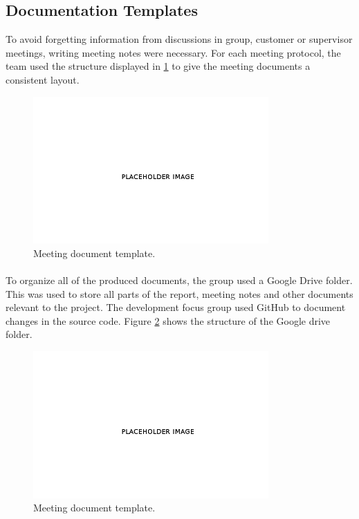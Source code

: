 \subsection{Documentation Templates}
\label{subsec:PlanningQualityDocu}
To avoid forgetting information from discussions in group, customer or supervisor meetings, writing meeting notes were necessary. For each meeting protocol, the team used the structure displayed in \ref{fig:PlanningQualityDocuMeeting} to give the meeting documents a consistent layout.

\begin{figure}[ht!]
\centering
\includegraphics[width=90mm]{./img/Placehoder}
\caption{Meeting document template. \label{fig:PlanningQualityDocuMeeting}}
\end{figure}

\paragraph{} To organize all of the produced documents, the group used a Google Drive folder. This was used to store all parts of the report, meeting notes and other documents relevant to the project. The development focus group used GitHub to document changes in the source code. Figure \ref{fig:PlanningQualityDocuDrive} shows the structure of the Google drive folder.

\begin{figure}[ht!]
\centering
\includegraphics[width=90mm]{./img/Placehoder}
\caption{Meeting document template. \label{fig:PlanningQualityDocuDrive}}
\end{figure}

